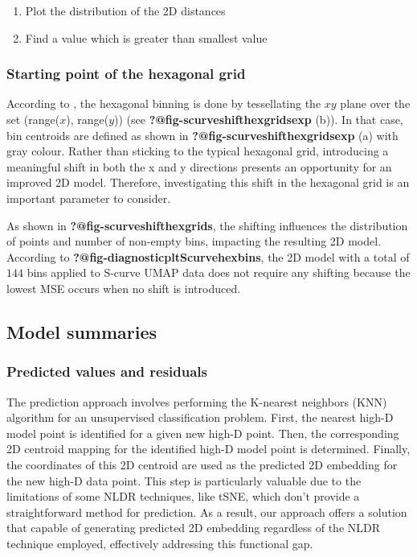 \documentclass[
  12pt]{article}
\begin{document}
\begin{enumerate}
\def\labelenumi{\arabic{enumi}.}
\item
  Plot the distribution of the 2D distances
\item
  Find a value which is greater than smallest value
\end{enumerate}

\hypertarget{starting-point-of-the-hexagonal-grid}{%
\subsubsection{Starting point of the hexagonal
grid}\label{starting-point-of-the-hexagonal-grid}}

According to \citet{Dan2023}, the hexagonal binning is done by
tessellating the \(xy\) plane over the set (range(\(x\)), range(\(y\)))
(see \textbf{?@fig-scurveshifthexgridsexp} (b)). In that case, bin
centroids are defined as shown in \textbf{?@fig-scurveshifthexgridsexp}
(a) with gray colour. Rather than sticking to the typical hexagonal
grid, introducing a meaningful shift in both the x and y directions
presents an opportunity for an improved 2D model. Therefore,
investigating this shift in the hexagonal grid is an important parameter
to consider.

As shown in \textbf{?@fig-scurveshifthexgrids}, the shifting influences
the distribution of points and number of non-empty bins, impacting the
resulting 2D model. According to
\textbf{?@fig-diagnosticpltScurvehexbins}, the 2D model with a total of
\(144\) bins applied to S-curve UMAP data does not require any shifting
because the lowest MSE occurs when no shift is introduced.

\hypertarget{sec-summary}{%
\subsection{Model summaries}\label{sec-summary}}

\hypertarget{predicted-values-and-residuals}{%
\subsubsection{Predicted values and
residuals}\label{predicted-values-and-residuals}}

The prediction approach involves performing the K-nearest neighbors
(KNN) algorithm for an unsupervised classification problem. First, the
nearest high-D model point is identified for a given new high-D point.
Then, the corresponding 2D centroid mapping for the identified high-D
model point is determined. Finally, the coordinates of this 2D centroid
are used as the predicted 2D embedding for the new high-D data point.
This step is particularly valuable due to the limitations of some NLDR
techniques, like tSNE, which don't provide a straightforward method for
prediction. As a result, our approach offers a solution that capable of
generating predicted 2D embedding regardless of the NLDR technique
employed, effectively addressing this functional gap.
\end{document}
